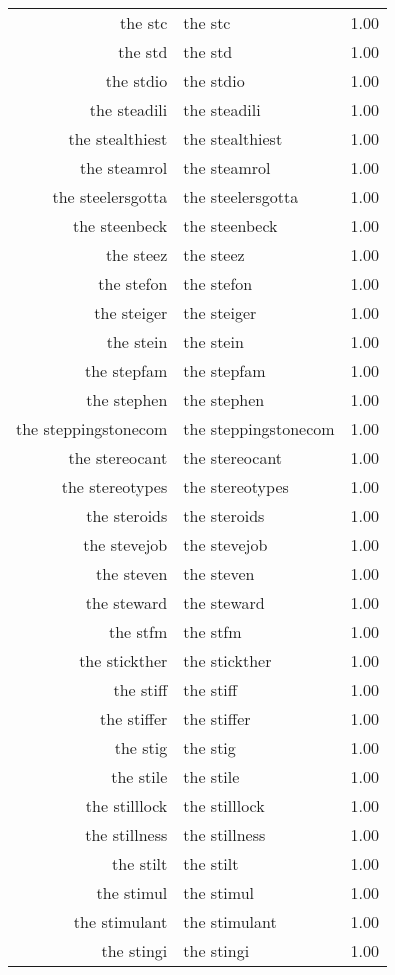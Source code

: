 \begin{table}[ht]
\begin{tabular}{rlr}
  the stc & the stc & 1.00 \\ 
  the std & the std & 1.00 \\ 
  the stdio & the stdio & 1.00 \\ 
  the steadili & the steadili & 1.00 \\ 
  the stealthiest & the stealthiest & 1.00 \\ 
  the steamrol & the steamrol & 1.00 \\ 
  the steelersgotta & the steelersgotta & 1.00 \\ 
  the steenbeck & the steenbeck & 1.00 \\ 
  the steez & the steez & 1.00 \\ 
  the stefon & the stefon & 1.00 \\ 
  the steiger & the steiger & 1.00 \\ 
  the stein & the stein & 1.00 \\ 
  the stepfam & the stepfam & 1.00 \\ 
  the stephen & the stephen & 1.00 \\ 
  the steppingstonecom & the steppingstonecom & 1.00 \\ 
  the stereocant & the stereocant & 1.00 \\ 
  the stereotypes & the stereotypes & 1.00 \\ 
  the steroids & the steroids & 1.00 \\ 
  the stevejob & the stevejob & 1.00 \\ 
  the steven & the steven & 1.00 \\ 
  the steward & the steward & 1.00 \\ 
  the stfm & the stfm & 1.00 \\ 
  the stickther & the stickther & 1.00 \\ 
  the stiff & the stiff & 1.00 \\ 
  the stiffer & the stiffer & 1.00 \\ 
  the stig & the stig & 1.00 \\ 
  the stile & the stile & 1.00 \\ 
  the stilllock & the stilllock & 1.00 \\ 
  the stillness & the stillness & 1.00 \\ 
  the stilt & the stilt & 1.00 \\ 
  the stimul & the stimul & 1.00 \\ 
  the stimulant & the stimulant & 1.00 \\ 
  the stingi & the stingi & 1.00 \\ 

\end{tabular}
\end{table}
